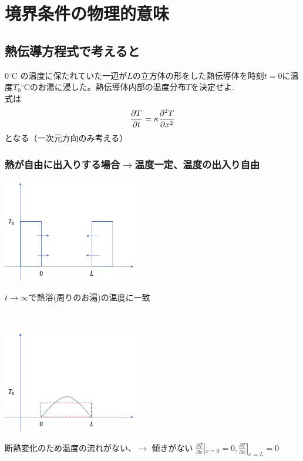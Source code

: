 \documentclass[titlepage,dvipdfmx]{jsarticle}
\begin{document}
\section{境界条件の物理的意味}
\subsection{熱伝導方程式で考えると}
$0{}^\circ $C の温度に保たれていた一辺が$L$の立方体の形をした熱伝導体を時刻$t=0$に温度$T_0 {}^\circ $Cのお湯に浸した。熱伝導体内部の温度分布$T$を決定せよ.\\
式は
\begin{equation}\displaystyle
\displaystyle \frac{\partial T}{\partial t}=\kappa  \frac{\partial^2 T}{\partial x^2} \nonumber
\end{equation}
となる（一次元方向のみ考える）
\subsubsection{熱が自由に出入りする場合$\rightarrow$温度一定、温度の出入り自由}

\begin{minipage}{.40\textwidth}
\flushleft
\includegraphics[height=4.5cm, clip]{1.png}
\end{minipage}
\hfill
\begin{minipage}{.50\textwidth}
$t\rightarrow \infty$で熱浴(周りのお湯)の温度に一致\\
\end{minipage}\\

\begin{minipage}{.40\textwidth}
\flushleft
\includegraphics[height=4.5cm, clip]{2.png}
\end{minipage}
\hfill
\begin{minipage}{.50\textwidth}
断熱変化のため温度の流れがない、$\rightarrow$ 傾きがない
$\displaystyle \frac{\partial T}{\partial x}|_{x=0}=0,\frac{\partial T}{\partial x}|_{x=L}=0$
\end{minipage}\\
\end{document}
